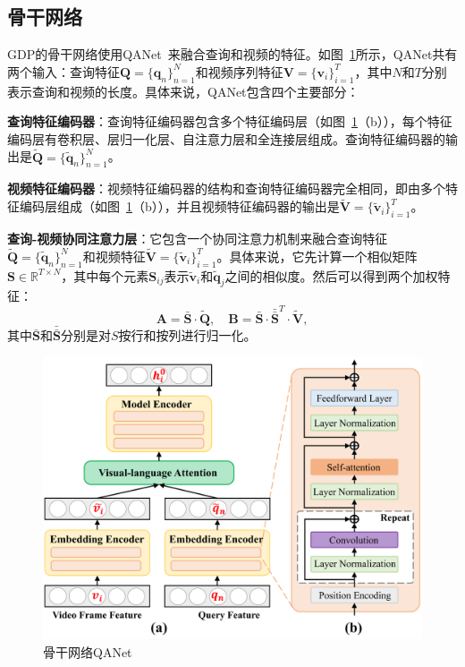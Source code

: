 \subsection{骨干网络}
GDP的骨干网络使用QANet~\cite{yu2018qanet}来融合查询和视频的特征。如图~\ref{ch6:fig:qanet}所示，QANet共有两个输入：查询特征$\bm{Q} = \{\bm{q}_n\}^N_{n=1}$和视频序列特征$\bm{V}=\{\bm{v}_i\}^T_{i=1}$，其中$N$和$T$分别表示查询和视频的长度。具体来说，QANet包含四个主要部分：

\textbf{查询特征编码器}：查询特征编码器包含多个特征编码层（如图~\ref{ch6:fig:qanet}（b）），每个特征编码层有卷积层、层归一化层、自注意力层和全连接层组成。查询特征编码器的输出是$\bm{\tilde{Q}}=\{\bm{\tilde{q}}_n\}^N_{n=1}$。

\textbf{视频特征编码器}：视频特征编码器的结构和查询特征编码器完全相同，即由多个特征编码层组成（如图~\ref{ch6:fig:qanet}（b）），并且视频特征编码器的输出是$\bm{\tilde{V}} = \{\bm{\tilde{v}}_i\}^T_{i=1}$。


\textbf{查询-视频协同注意力层}：它包含一个协同注意力机制来融合查询特征$\bm{\tilde{Q}}=\{\bm{\tilde{q}}_n\}^N_{n=1}$和视频特征$\bm{\tilde{V}} = \{\bm{\tilde{v}}_i\}^T_{i=1}$。具体来说，它先计算一个相似矩阵$\bm{S}\in\mathbb{R}^{T\times N}$，其中每个元素$\bm{S}_{ij}$表示$\bm{\tilde{v}}_i$和$\bm{\tilde{q}}_j$之间的相似度。然后可以得到两个加权特征：
\begin{equation}
  \bm{A} = \bar{\bm{S}} \cdot \tilde{\bm{Q}}, \quad \bm{B} = \bar{\bm{S}} \cdot \bar{\bar{\bm{S}}}^T \cdot \tilde{\bm{V}},
\end{equation}
其中$\bar{\bm{S}}$和$\bar{\bar{\bm{S}}}$分别是对$S$按行和按列进行归一化。


\begin{figure}[tbp]
    \centering
    \includegraphics[width=0.7\linewidth]{chapter6/res/qanet.pdf}
    \caption{骨干网络QANet}
    \label{ch6:fig:qanet}
\end{figure}


